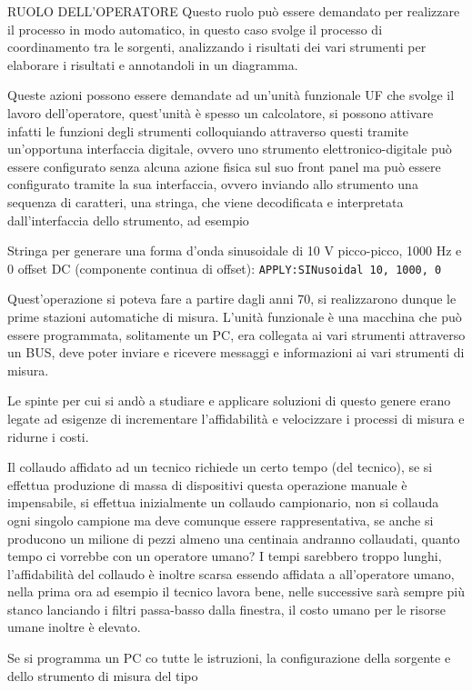 RUOLO DELL'OPERATORE
Questo ruolo può essere demandato per realizzare il processo in modo automatico,
in questo caso
svolge il processo di coordinamento tra le sorgenti, analizzando i risultati dei
vari strumenti per
elaborare i risultati e annotandoli in un diagramma.

Queste azioni possono essere demandate ad un'unità funzionale UF che svolge il
lavoro
dell'operatore, quest'unità è spesso un calcolatore, si possono attivare infatti
le funzioni degli
strumenti colloquiando attraverso questi tramite un'opportuna interfaccia
digitale, ovvero uno
strumento elettronico-digitale può essere configurato senza alcuna azione fisica
sul suo front
panel ma può essere configurato tramite la sua interfaccia, ovvero inviando allo
strumento una
sequenza di caratteri, una stringa, che viene decodificata e interpretata
dall'interfaccia dello
strumento, ad esempio

Stringa per generare una forma d'onda sinusoidale di 10 V picco-picco, 1000 Hz e
0 offset DC
(componente continua di offset):
\verb|APPLY:SINusoidal 10, 1000, 0|

Quest'operazione si poteva fare a partire dagli anni 70, si realizzarono dunque
le prime stazioni
automatiche di misura.
L'unità funzionale è una macchina che può essere programmata, solitamente un PC,
era collegata ai
vari strumenti attraverso un BUS, deve poter inviare e ricevere messaggi e
informazioni ai vari
strumenti di misura.

Le spinte per cui si andò a studiare e applicare soluzioni di questo genere
erano legate ad
esigenze di incrementare l'affidabilità e velocizzare i processi di misura e
ridurne i costi.

Il collaudo affidato ad un tecnico richiede un certo tempo (del tecnico), se si
effettua produzione
di massa di dispositivi questa operazione manuale è impensabile, si effettua
inizialmente un
collaudo campionario, non si collauda ogni singolo campione ma deve comunque
essere
rappresentativa, se anche si producono un milione di pezzi almeno una centinaia
andranno
collaudati, quanto tempo ci vorrebbe con un operatore umano? I tempi sarebbero
troppo lunghi,
l'affidabilità del collaudo è inoltre scarsa essendo affidata a all'operatore
umano, nella prima
ora ad esempio il tecnico lavora bene, nelle successive sarà sempre più stanco
lanciando i filtri
passa-basso dalla finestra, il costo umano per le risorse umane inoltre è
elevato.

Se si programma un PC co tutte le istruzioni, la configurazione della sorgente e
dello strumento di
misura del tipo

